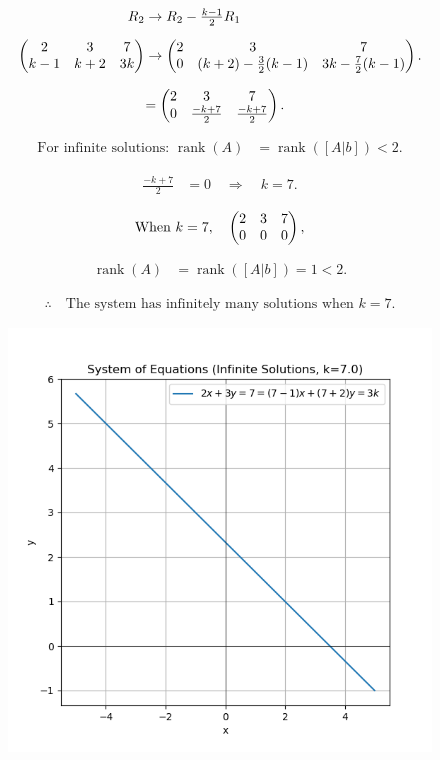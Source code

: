 \documentclass[12pt]{article}
\begin{document}
\begin{align}
R_2 &\to R_2 - \tfrac{k-1}{2}R_1 \\[6pt]
\begin{pmatrix}2 & 3 & 7 \\ k-1 & k+2 & 3k\end{pmatrix}
&\to 
\begin{pmatrix}2 & 3 & 7 \\ 0 & (k+2) - \tfrac{3}{2}(k-1) & 3k - \tfrac{7}{2}(k-1)\end{pmatrix}.
\end{align}

\begin{align}
&= \begin{pmatrix}2 & 3 & 7 \\ 0 & \tfrac{-k+7}{2} & \tfrac{-k+7}{2}\end{pmatrix}.
\end{align}

\begin{align}
\text{For infinite solutions: } 
\operatorname{rank}(A) &= \operatorname{rank}([A|b]) < 2.
\end{align}

\begin{align}
\tfrac{-k+7}{2} &= 0 \quad \Longrightarrow \quad k=7.
\end{align}

\begin{align}
\text{When } k=7,\quad
\begin{pmatrix}2 & 3 & 7 \\ 0 & 0 & 0\end{pmatrix},
\end{align}

\begin{align}
\operatorname{rank}(A) &= \operatorname{rank}([A|b])=1 < 2.
\end{align}

\begin{align}
\therefore \quad \text{The system has infinitely many solutions when } 
\boxed{k=7}.
\end{align}

\begin{figure}[H]
    \centering
    \includegraphics[width=0.9\columnwidth]{figs/infsols.png}
    \caption{}
    \label{fig:placeholder}
\end{figure}
\end{document}
